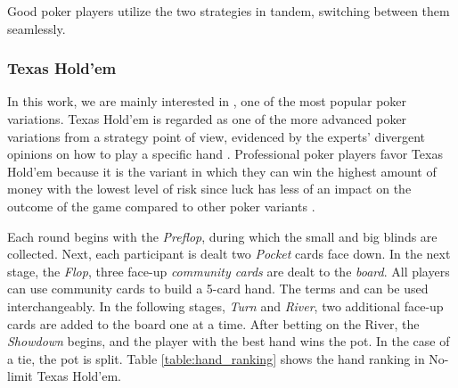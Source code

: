 Good poker players utilize the two strategies in tandem, switching between them seamlessly.


\subsubsection{Texas Hold'em}

In this work, we are mainly interested in , one of the most popular poker variations. Texas Hold'em is regarded as one of the more advanced poker variations from a strategy point of view, evidenced by the experts' divergent opinions on how to play a specific hand \cite{sklansky_2003}. Professional poker players favor Texas Hold'em because it is the variant in which they can win the highest amount of money with the lowest level of risk since luck has less of an impact on the outcome of the game compared to other poker variants \cite{malmuth_2004}.

Each round begins with the \textit{Preflop}, during which the small and big blinds are collected. Next, each participant is dealt two \textit{Pocket} cards face down. In the next stage, the \textit{Flop}, three face-up \textit{community cards} are dealt to the \textit{board}. All players can use community cards to build a 5-card hand. The terms  and  can be used interchangeably. In the following stages, \textit{Turn} and \textit{River}, two additional face-up cards are added to the board one at a time. After betting on the River, the \textit{Showdown} begins, and the player with the best hand wins the pot. In the case of a tie, the pot is split. Table \ref{table:hand_ranking} shows the hand ranking in No-limit Texas Hold'em.

